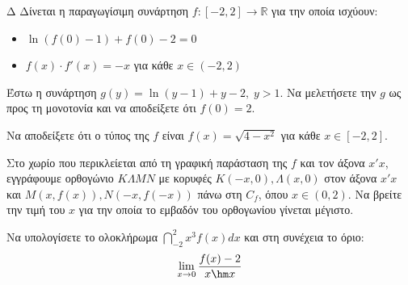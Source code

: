 \begin{thema}{Δ}
Δίνεται η παραγωγίσιμη συνάρτηση $f:[-2,2]\to\mathbb{R}$ για την οποία ισχύουν:
\begin{itemize}
    \item $\ln{\left(f(0)-1\right)}+f(0)-2=0$
    \item $f(x)\cdot f'(x)=-x$ για κάθε $x\in(-2,2)$
\end{itemize}
\begin{erwthma}
    \item Έστω η συνάρτηση $g(y) = \ln(y-1) + y - 2, \; y > 1$. Να μελετήσετε την $g$ ως προς τη μονοτονία και να αποδείξετε ότι $f(0)=2$.
    \item Να αποδείξετε ότι ο τύπος της $f$ είναι $\displaystyle f(x)=\sqrt{4-x^2}$ για κάθε $x\in[-2,2]$.
    \item Στο χωρίο που περικλείεται από τη γραφική παράσταση της $f$ και τον άξονα $x'x$, εγγράφουμε ορθογώνιο $K\Lambda MN$ με κορυφές $K(-x, 0), \Lambda(x, 0)$ στον άξονα $x'x$ και $M(x, f(x)), N(-x, f(-x))$ πάνω στη $C_f$, όπου $x \in (0, 2)$. Να βρείτε την τιμή του $x$ για την οποία το εμβαδόν του ορθογωνίου γίνεται μέγιστο.
    \item Να υπολογίσετε το ολοκλήρωμα $\displaystyle \dint_{-2}^2 x^3 f(x) dx$ και στη συνέχεια το όριο:
    \[ \lim_{x \to 0} \frac{f(x) - 2}{x \hm x} \]
\end{erwthma}
\end{thema}
